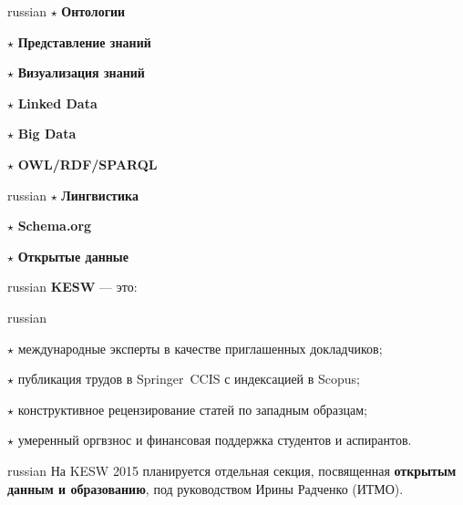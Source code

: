 \documentclass[a4paper, 10pt]{article}
\renewcommand{\skip}{\vspace{1ex}}
\renewcommand{\bullet}{\ensuremath{\star} }
\begin{document}
\begin{minipage}[t]{.35\textwidth}
\begin{otherlanguage*}{russian}
\noindent
\bullet \textbf{Онтологии}

\bullet \textbf{Представление знаний}

\bullet \textbf{Визуализация знаний}

\end{otherlanguage*}
\end{minipage}
\hfill
\begin{minipage}[t]{.30\textwidth}

\bullet \textbf{Linked Data}

\bullet \textbf{Big Data}

\bullet\textbf{OWL/RDF/SPARQL}

\end{minipage}
\hfill
\begin{minipage}[t]{.28\textwidth}

\begin{otherlanguage*}{russian}
\bullet \textbf{Лингвистика}

\bullet \textbf{Schema.org}

\bullet \textbf{Открытые данные}

\end{otherlanguage*}

\end{minipage}

\skip
\skip

\begin{otherlanguage*}{russian}
\noindent \textbf{KESW} --- это:
\end{otherlanguage*}

\skip\skip

\begin{otherlanguage*}{russian}

\noindent\bullet международные эксперты в качестве приглашенных докладчиков;

\noindent\bullet публикация трудов в Springer~CCIS с индексацией в Scopus;

\noindent\bullet конструктивное рецензирование статей по западным образцам;

\noindent\bullet умеренный оргвзнос и финансовая поддержка студентов и аспирантов.

\end{otherlanguage*}

\skip\skip

\begin{otherlanguage*}{russian}
\noindent 
На KESW 2015 планируется отдельная секция, посвященная \textbf{открытым данным и
образованию}, под руководством  Ирины Радченко (ИТМО). 
\end{otherlanguage*}
\end{document}
